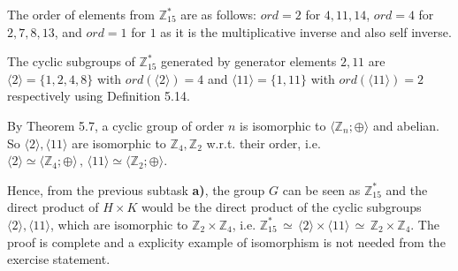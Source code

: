 \documentclass[unicode,11pt,a4paper,oneside,numbers=endperiod,openany]{scrartcl}
\def\Z{\mathbb{Z}}
\newcommand{\Zgmult}[1]{\mathbb{Z}_{#1}^{\ast}}
\begin{document}
The order of elements from \( \Z^{\ast}_{15} \) are as follows:
\( ord = 2 \) for \( 4, 11, 14 \),
\( ord = 4 \) for \( 2, 7, 8, 13 \),
and \( ord = 1 \) for \( 1 \) as it is the multiplicative inverse and also self inverse.

The cyclic subgroups of \( \Zgmult{15} \) generated by generator elements \( 2, 11 \) 
are \( \langle 2 \rangle = \{ 1, 2, 4, 8 \} \) with \( ord( \langle 2 \rangle ) = 4\) 
and \( \langle 11 \rangle = \{ 1, 11 \} \) with \( ord( \langle 11 \rangle ) = 2 \) respectively
using Definition 5.14.

By Theorem 5.7, a cyclic group of order \( n \) is isomorphic to \( \langle \Z_n ; \oplus \rangle \) 
and abelian.
So \( \langle 2 \rangle, \langle 11 \rangle \) are isomorphic to \( \Z_4, \Z_2 \) w.r.t. their order,
i.e. \( \langle 2 \rangle \simeq \langle \Z_4; \oplus \rangle 
\,, \, \langle 11 \rangle \simeq \langle \Z_2 ; \oplus \rangle \). 

Hence, from the previous subtask \textbf{a)},
the group \( G \) can be seen as \( \Zgmult{15} \) and the direct product of \( H \times K \)
would be the direct product of the cyclic subgroups
\( \langle 2 \rangle, \langle 11 \rangle \), which are isomorphic to \( \Z_2 \times \Z_4 \),
i.e. \( \Zgmult{15} \, \simeq \, \langle 2 \rangle \times \langle 11 \rangle \, \simeq \, \Z_2 \times \Z_4 \).
The proof is complete and a explicity example of isomorphism is not needed from the exercise statement.
\end{document}
